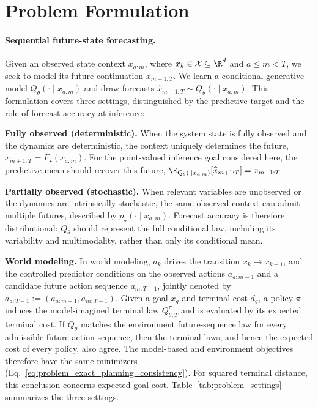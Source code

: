 \section{Problem Formulation}
\label{sec:problem-formulation}
\paragraph{Sequential future-state forecasting.}
Given an observed state context $x_{a:m}$, where
$x_k\in\mathcal X\subseteq\R^d$ and $a\leq m<T$, we seek to model its future
continuation $x_{m+1:T}$.  We learn a conditional generative model
$Q_\theta(\cdot\mid x_{a:m})$ and draw forecasts
$\widehat x_{m+1:T}\sim Q_\theta(\cdot\mid x_{a:m})$.  This formulation
covers three settings, distinguished by the predictive target and the role of
forecast accuracy at inference:

\par\smallskip
\noindent\textbf{Fully observed (deterministic).}
When the system state is fully observed and the dynamics are deterministic,
the context uniquely determines the future,
$x_{m+1:T}=F_\star(x_{a:m})$.  For the point-valued inference goal considered
here, the predictive mean should recover this future,
$\E_{Q_\theta(\cdot\mid x_{a:m})}[\widehat x_{m+1:T}]=x_{m+1:T}$.

\par\smallskip
\noindent\textbf{Partially observed (stochastic).}
When relevant variables are unobserved or the dynamics are intrinsically
stochastic, the same observed context can admit multiple futures, described by
$p_\star(\cdot\mid x_{a:m})$.  Forecast accuracy is therefore distributional:
$Q_\theta$ should represent the full conditional law, including its
variability and multimodality, rather than only its conditional mean.

\par\smallskip
\noindent\textbf{World modeling.}
In world modeling, $a_k$ drives the transition $x_k\to x_{k+1}$, and the
controlled predictor conditions on the observed actions $a_{a:m-1}$ and a
candidate future action sequence $a_{m:T-1}$, jointly denoted by
$a_{a:T-1}:=(a_{a:m-1},a_{m:T-1})$.  Given a goal $x_g$ and terminal cost
$d_g$, a policy $\pi$ induces the model-imagined terminal law
$Q_{\theta,T}^{\pi}$ and is evaluated by its expected terminal cost.  If
$Q_\theta$ matches the environment future-sequence law for every admissible
future action sequence, then the terminal laws, and hence the expected cost of
every policy, also agree.  The model-based and environment objectives
therefore have the same minimizers
(Eq.~\ref{eq:problem_exact_planning_consistency}).  For squared terminal
distance, this conclusion concerns expected goal cost.
Table~\ref{tab:problem_settings} summarizes the three settings.

